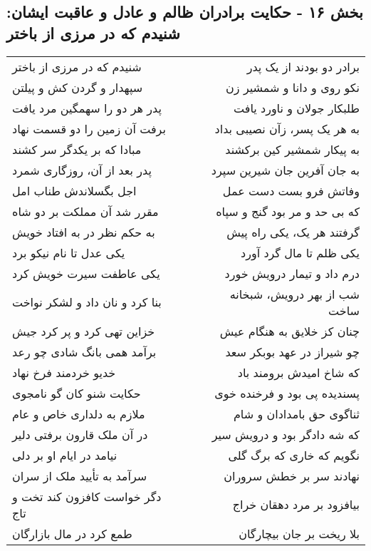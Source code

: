 \begin{center}
\section*{بخش ۱۶ - حکایت برادران ظالم و عادل و عاقبت ایشان: شنیدم که در مرزی از باختر}
\label{sec:016}
\begin{longtable}{l p{0.5cm} r}
شنیدم که در مرزی از باختر
&&
برادر دو بودند از یک پدر
\\
سپهدار و گردن کش و پیلتن
&&
نکو روی و دانا و شمشیر زن
\\
پدر هر دو را سهمگین مرد یافت
&&
طلبکار جولان و ناورد یافت
\\
برفت آن زمین را دو قسمت نهاد
&&
به هر یک پسر، زآن نصیبی بداد
\\
مبادا که بر یکدگر سر کشند
&&
به پیکار شمشیر کین برکشند
\\
پدر بعد از آن، روزگاری شمرد
&&
به جان آفرین جان شیرین سپرد
\\
اجل بگسلاندش طناب امل
&&
وفاتش فرو بست دست عمل
\\
مقرر شد آن مملکت بر دو شاه
&&
که بی حد و مر بود گنج و سپاه
\\
به حکم نظر در به افتاد خویش
&&
گرفتند هر یک، یکی راه پیش
\\
یکی عدل تا نام نیکو برد
&&
یکی ظلم تا مال گرد آورد
\\
یکی عاطفت سیرت خویش کرد
&&
درم داد و تیمار درویش خورد
\\
بنا کرد و نان داد و لشکر نواخت
&&
شب از بهر درویش، شبخانه ساخت
\\
خزاین تهی کرد و پر کرد جیش
&&
چنان کز خلایق به هنگام عیش
\\
برآمد همی بانگ شادی چو رعد
&&
چو شیراز در عهد بوبکر سعد
\\
خدیو خردمند فرخ نهاد
&&
که شاخ امیدش برومند باد
\\
حکایت شنو کان گو نامجوی
&&
پسندیده پی بود و فرخنده خوی
\\
ملازم به دلداری خاص و عام
&&
ثناگوی حق بامدادان و شام
\\
در آن ملک قارون برفتی دلیر
&&
که شه دادگر بود و درویش سیر
\\
نیامد در ایام او بر دلی
&&
نگویم که خاری که برگ گلی
\\
سرآمد به تأیید ملک از سران
&&
نهادند سر بر خطش سروران
\\
دگر خواست کافزون کند تخت و تاج
&&
بیافزود بر مرد دهقان خراج
\\
طمع کرد در مال بازارگان
&&
بلا ریخت بر جان بیچارگان
\\

\end{longtable}
\end{center}
